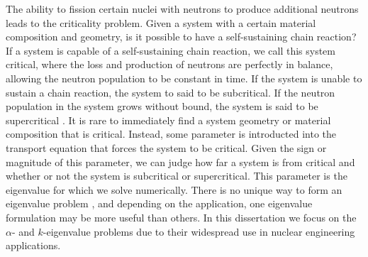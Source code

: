 The ability to fission certain nuclei with neutrons to produce additional neutrons leads to the criticality problem. Given a system with a certain material composition and geometry, is it possible to have a self-sustaining chain reaction? If a system is capable of a self-sustaining chain reaction, we call this system critical, where the loss and production of neutrons are perfectly in balance, allowing the neutron population to be constant in time. If the system is unable to sustain a chain reaction, the system to said to be subcritical. If the neutron population in the system grows without bound, the system is said to be supercritical \cite{bell_nuclear_1970}. It is rare to immediately find a system geometry or material composition that is critical. Instead, some parameter is introducted into the transport equation that forces the system to be critical. Given the sign or magnitude of this parameter, we can judge how far a system is from critical and whether or not the system is subcritical or supercritical. This parameter is the eigenvalue for which we solve numerically. There is no unique way to form an eigenvalue problem \cite{ronen_comparison_1976}, and depending on the application, one eigenvalue formulation may be more useful than others. In this dissertation we focus on the $\alpha$- and $k$-eigenvalue problems due to their widespread use in nuclear engineering applications.

